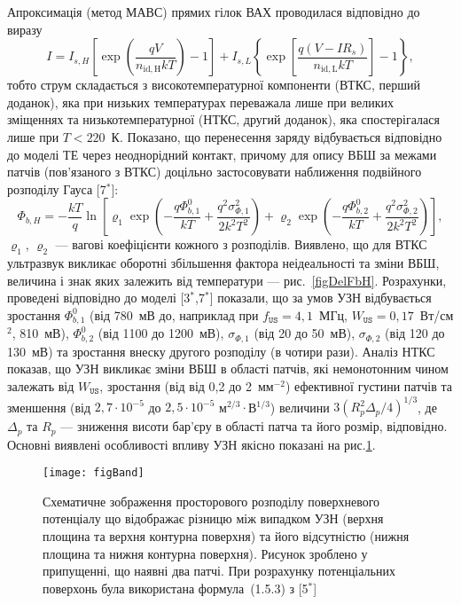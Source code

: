 Апроксимація (метод МАВС) прямих гілок ВАХ проводилася відповідно до виразу
\begin{equation}
\label{eqSDB_IV}
  I=I_{s,H}\left[\exp\left(\frac{qV}{n_\mathrm{id,H}kT}\right)-1\right]+
 I_{s,L}\left\{\exp\left[\frac{q(V-IR_s)}{n_\mathrm{id,L}kT}\right]-1\right\},
\end{equation}
тобто струм складається з високотемпературної компоненти (ВТКС, перший доданок), яка при низьких температурах переважала лише при великих зміщеннях та низькотемпературної (НТКС, другий доданок),
яка спостерігалася лише при $T<220$~К.
Показано, що перенесення заряду відбувається відповідно до моделі ТЕ через неоднорідний контакт,
причому для опису ВБШ за межами патчів (пов'язаного з ВТКС) доцільно застосовувати наближення подвійного розподілу Гауса
[7$^*$]:
\begin{equation}
\label{eqDG}
  \Phi_{b,H}=-\frac{kT}{q}\ln\left[\varrho_1\exp\left(-\frac{q\Phi_{b,1}^0}{kT}+
  \frac{q^2\sigma^2_{\Phi,1}}{2k^2T^2}\right)
   +
  \varrho_2\exp\left(-\frac{q\Phi_{b,2}^{0}}{kT}+
  \frac{q^2\sigma^2_{\Phi,2}}{2k^2T^2}\right)\right],
\end{equation}
$\varrho_1$, $\varrho_2$  --- вагові коефіцієнти кожного з розподілів.
Виявлено, що для ВТКС ультразвук викликає оборотні збільшення фактора неідеальності та зміни ВБШ,
величина і знак яких залежить від температури --- рис.~\ref{figDelFbH}.
Розрахунки, проведені відповідно до моделі
[3$^*$,7$^*$] показали, що за умов УЗН відбувається зростання
$\Phi_{b,1}^0$ (від 780~мВ до, наприклад при $f_\mathtt{US}=4,1$~МГц, $W_\mathtt{US}=0,17$~Вт/см$^2$,  810~мВ),
$\Phi_{b,2}^0$ (від 1100 до  1200~мВ),
$\sigma_{\Phi,1}$ (від 20 до  50~мВ),
$\sigma_{\Phi,2}$ (від 120 до  130~мВ) та
зростання внеску другого розподілу (в чотири рази).
Аналіз НТКС показав, що УЗН викликає зміни ВБШ в області патчів, які немонотонним чином залежать від $W_\mathtt{US}$,
зростання (від від 0,2 до 2~мм$^{-2}$) ефективної густини патчів та зменшення (від $2,7\cdot10^{-5}$ до $2,5\cdot10^{-5}$ м$^{2/3}\cdot$В$^{1/3}$)
величини $3(R_p^2\Delta_p/4)^{1/3}$, де $\Delta_p$ та $R_p$ --- зниження висоти бар'єру в області патча та його розмір, відповідно.
Основні виявлені особливості впливу УЗН якісно показані на рис.\ref{figBand}.



\begin{figure}
\center
\texttt{[image: figBand]}
\caption{\label{figBand}
Схематичне зображення
просторового розподілу поверхневого потенціалу
що відображає різницю між випадком УЗН (верхня площина та верхня контурна поверхня) та
його відсутністю (нижня площина та нижня контурна поверхня).
Рисунок зроблено у припущенні, що наявні два патчі.
При розрахунку потенціальних поверхонь була використана формула~(1.5.3) з
[5$^*$]
}%
\end{figure}

